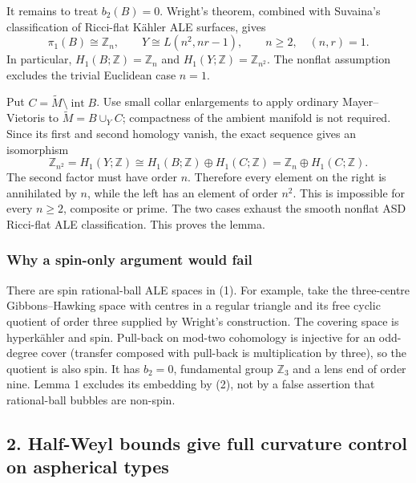 \documentclass[
  11pt,
]{article}
\begin{document}
It remains to treat \(b_2(B)=0\). Wright's theorem, combined with
Suvaina's classification of Ricci-flat Kähler ALE surfaces, gives \[
 \pi_1(B)\cong\mathbb Z_n,\qquad
 Y\cong L(n^2,nr-1),\qquad n\ge2,\quad (n,r)=1.            \tag{1}
\] In particular, \(H_1(B;\mathbb Z)=\mathbb Z_n\) and
\(H_1(Y;\mathbb Z)=\mathbb Z_{n^2}\). The nonflat assumption excludes
the trivial Euclidean case \(n=1\).

Put \(C=\widetilde M\setminus\operatorname{int}B\). Use small collar
enlargements to apply ordinary Mayer--Vietoris to
\(\widetilde M=B\cup_Y C\); compactness of the ambient manifold is not
required. Since its first and second homology vanish, the exact sequence
gives an isomorphism \[
 \mathbb Z_{n^2}=H_1(Y;\mathbb Z)
       \cong H_1(B;\mathbb Z)\oplus H_1(C;\mathbb Z)
       =\mathbb Z_n\oplus H_1(C;\mathbb Z).                 \tag{2}
\] The second factor must have order \(n\). Therefore every element on
the right is annihilated by \(n\), while the left has an element of
order \(n^2\). This is impossible for every \(n\ge2\), composite or
prime. The two cases exhaust the smooth nonflat ASD Ricci-flat ALE
classification. This proves the lemma.

\hypertarget{why-a-spin-only-argument-would-fail}{%
\subsubsection{Why a spin-only argument would
fail}\label{why-a-spin-only-argument-would-fail}}

There are spin rational-ball ALE spaces in (1). For example, take the
three-centre Gibbons--Hawking space with centres in a regular triangle
and its free cyclic quotient of order three supplied by Wright's
construction. The covering space is hyperkähler and spin. Pull-back on
mod-two cohomology is injective for an odd-degree cover (transfer
composed with pull-back is multiplication by three), so the quotient is
also spin. It has \(b_2=0\), fundamental group \(\mathbb Z_3\) and a
lens end of order nine. Lemma 1 excludes its embedding by (2), not by a
false assertion that rational-ball bubbles are non-spin.

\hypertarget{half-weyl-bounds-give-full-curvature-control-on-aspherical-types}{%
\subsection{2. Half-Weyl bounds give full curvature control on
aspherical
types}\label{half-weyl-bounds-give-full-curvature-control-on-aspherical-types}}
\end{document}
